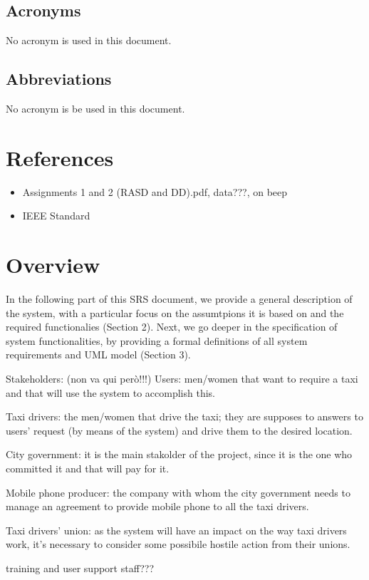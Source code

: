 \subsection{Acronyms}
No acronym is used in this document.


\subsection{Abbreviations}
No acronym is be used in this document.


\section{References}
\begin{itemize}
\item Assignments 1 and 2 (RASD and DD).pdf, data???, on beep
\item IEEE Standard
\end{itemize}


\section{Overview}
In the following part of this SRS document, we provide a general description of the system, with a particular focus on the assumtpions it is based on and the required functionalies (Section 2). Next, we go deeper in the specification of system functionalities, by providing a formal definitions of all system requirements and UML model (Section 3).

Stakeholders: (non va qui però!!!)
Users: men/women that want to require a taxi and that will use the system to accomplish this.

Taxi drivers: the men/women that drive the taxi; they are supposes to answers to users' request (by means of the system) and drive them to the desired location.

City government: it is the main stakolder of the project, since it is the one who committed it and that will pay for it.

Mobile phone producer: the company with whom the city government needs to manage an agreement  to provide mobile phone to all the taxi drivers.

Taxi drivers’ union: as the system will have an impact on the way taxi drivers work, it's necessary to consider some possibile hostile action from their unions.

training and user support staff???